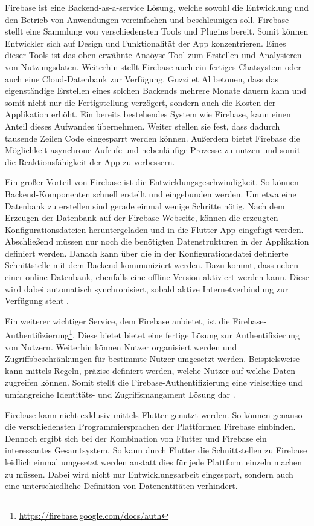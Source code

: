 Firebase ist eine Backend-as-a-service Lösung, welche sowohl die Entwicklung und den Betrieb von Anwendungen vereinfachen und beschleunigen soll. Firebase stellt eine Sammlung von verschiedensten Tools und Plugins bereit. Somit können Entwickler sich auf Design und Funktionalität der App konzentrieren. Eines dieser Tools ist das oben erwähnte Anaöyse-Tool zum Erstellen und Analysieren von Nutzungsdaten. Weiterhin stellt Firebase auch ein fertiges Chatsystem oder auch eine Cloud-Datenbank zur Verfügung. Guzzi et Al \cite{Flutter_Apprentice} betonen, dass das eigenständige Erstellen eines solchen Backends mehrere Monate dauern kann und somit nicht nur die Fertigstellung verzögert, sondern auch die Kosten der Applikation erhöht. Ein bereits bestehendes System wie Firebase, kann einen Anteil dieses Aufwandes übernehmen. Weiter stellen sie fest, dass dadurch tausende Zeilen Code eingesparrt werden können. Außerdem bietet Firebase die Möglichkeit asynchrone Aufrufe und nebenläufige Prozesse zu nutzen und somit die Reaktionsfähigkeit der App zu verbessern.

Ein großer Vorteil von Firebase ist die Entwicklungsgeschwindigkeit. So können Backend-Komponenten schnell erstellt und eingebunden werden. Um  etwa eine Datenbank zu erstellen sind gerade einmal wenige Schritte nötig. Nach dem Erzeugen der Datenbank auf der Firebase-Webseite, können die erzeugten Konfigurationsdateien heruntergeladen und in die Flutter-App eingefügt werden. Abschließend müssen nur noch die benötigten Datenstrukturen in der Applikation definiert werden. Danach kann über die in der Konfigurationsdatei definierte Schnittstelle mit dem Backend kommuniziert werden. Dazu kommt, dass neben einer online Datenbank, ebenfalls eine offline Version aktiviert werden kann. Diese wird dabei automatisch synchronisiert, sobald aktive Internetverbindung zur Verfügung steht \cite{flutter_firebase}.

Ein weiterer wichtiger Service, dem Firebase anbietet, ist die Firebase-Authentifizierung\footnote{\url{https://firebase.google.com/docs/auth}}. Diese bietet bietet eine fertige Lösung zur Authentifizierung von Nutzern. Weiterhin können Nutzer organisiert werden und Zugriffsbeschränkungen für bestimmte Nutzer umgesetzt werden. Beispielsweise kann mittels Regeln, präzise definiert werden, welche Nutzer auf welche Daten zugreifen können. Somit stellt die Firebase-Authentifizierung eine vielseitige und umfangreiche Identitäts- und Zugriffsmangament Lösung dar \cite{Flutter_Apprentice}.

Firebase kann nicht exklusiv mittels Flutter genutzt werden. So können genauso die verschiedensten Programmiersprachen der Plattformen Firebase einbinden. 
Dennoch ergibt sich bei der Kombination von Flutter und Firebase ein interessantes Gesamtsystem.
So kann durch Flutter die Schnittstellen zu Firebase leidlich einmal umgesetzt werden anstatt dies für jede Plattform einzeln machen zu müssen.
Dabei wird nicht nur Entwicklungsarbeit eingespart, sondern auch eine unterschiedliche Definition von Datenentitäten verhindert.


